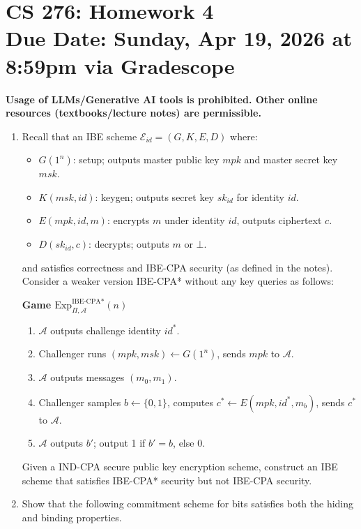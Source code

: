 \documentclass[11pt]{article}
\numberwithin{equation}{section}
\newcommand{\duedate}{Sunday, Apr 19, 2026 at 8:59pm via Gradescope}
\begin{document}
\section*{CS 276: Homework 4\\ {\small Due Date: \duedate} }
\textbf{Usage of LLMs/Generative AI tools is prohibited. Other online resources (textbooks/lecture notes) are permissible.}

\begin{enumerate}
    \item 
    Recall that an IBE scheme $\mathcal{E}_{id} = (G, K, E, D)$ where:
    \begin{itemize}
        \item $G(1^n)$: setup; outputs master public key $mpk$ and master secret key $msk$.
        \item $K(msk, id)$: keygen; outputs secret key $sk_{id}$ for identity $id$.
        \item $E(mpk, id, m)$: encrypts $m$ under identity $id$, outputs ciphertext $c$.
        \item $D(sk_{id}, c)$: decrypts; outputs $m$ or $\bot$.
    \end{itemize}
    and satisfies correctness and IBE-CPA security (as defined in the notes). Consider a weaker version IBE-CPA* without any key queries as follows:

    \begin{mdframed}
    \textbf{Game $\text{Exp}_{\Pi, \mathcal{A}}^{\text{IBE-CPA*}}(n)$}
    \begin{enumerate}
        \item $\mathcal{A}$ outputs challenge identity $id^*$.
        \item Challenger runs $(mpk, msk) \leftarrow G(1^n)$, sends $mpk$ to $\mathcal{A}$.
        \item $\mathcal{A}$ outputs messages $(m_0, m_1)$.
        \item Challenger samples $b \leftarrow \{0, 1\}$, computes $c^* \leftarrow E(mpk, id^*, m_b)$, sends $c^*$ to $\mathcal{A}$.
        \item $\mathcal{A}$ outputs $b'$; output 1 if $b' = b$, else 0.
    \end{enumerate}
    \end{mdframed}

    Given a IND-CPA secure public key encryption scheme, construct an IBE scheme that satisfies IBE-CPA* security but not IBE-CPA security.


    \item 
    Show that the following commitment scheme for bits satisfies both the hiding and binding properties.


\end{enumerate}
\end{document}
